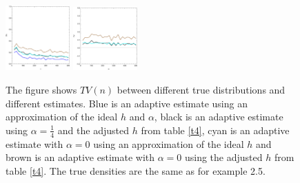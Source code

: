 \documentclass[
twoside,
openright,
titlepage,
numbers=noenddot,
headinclude,%
footinclude=true,
dottedtoc, %
ngerman,
american, %
pagesize=pdftex,
]{book}
\begin{document}
\begin{example}
\begin{figure}[H]
			\includegraphics[width=0.22\textwidth]{figures/1DTVexamples/e2sn+t1}
			\includegraphics[width=0.22\textwidth]{figures/1DTVexamples/e2sn+t2}
			\caption{The figure shows $TV(n)$ between different true distributions and different estimates. Blue is an adaptive estimate using an approximation of the ideal $h$ and $\alpha$, black is an adaptive estimate using $\alpha=\frac{1}{4}$ and the adjusted $h$ from table \ref{t4}, cyan is an adaptive estimate with $\alpha=0$ using an approximation of the ideal $h$ and brown is an adaptive estimate with $\alpha=0$ using the adjusted $h$ from table \ref{t4}. The true densities are the same as for example 2.5.}
			\label{fig:7}
		\end{figure}
	\end{example}
	
\end{document}
